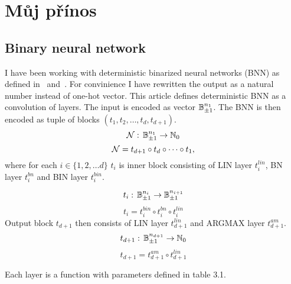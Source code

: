 \documentclass{fithesis}
\begin{document}

\chapter{Můj přínos}

\section{Binary neural network}

I have been working with deterministic binarized neural networks (BNN)
as defined in~\cite{Hubara2016BinarizedNN} and~\cite{10.1145/3563212}.
For convinience I have rewritten the output as a natural number instead of
one-hot vector.
This article defines deterministic BNN as a convolution of layers.
The input is
encoded as vector $\mathbb{B}_{\pm 1}^{n_1}$. The BNN is then encoded as tuple of blocks
$(t_1, t_2, \dots, t_d, t_{d+1})$.
\begin{equation*}
    \mathcal{N}: \, \mathbb{B}_{\pm 1}^{n_1} \to \mathbb{N}_0
\end{equation*}
\begin{equation}
    \mathcal{N} = t_{d+1} \circ t_d \circ \dots \circ t_1,
\end{equation}
where for each $i\in \{1, 2, \dots d\}$ $t_i$ is inner block consisting
of LIN layer $t_i^{lin}$, BN layer $t_i^{bn}$ and BIN layer $t_i^{bin}$.

\begin{equation*}
    t_i: \, \mathbb{B}_{\pm 1}^{n_i} \to \mathbb{B}_{\pm 1}^{n_{i+1}}
\end{equation*}
\begin{equation}
    t_i = t_i^{bin} \circ t_i^{bn} \circ t_i^{lin}
\end{equation}
Output block $t_{d+1}$ then consists of LIN layer $t_{d+1}^{lin}$ and ARGMAX layer
$t_{d+1}^{am}$.
\begin{equation*}
    t_{d+1}: \, \mathbb{B}_{\pm 1}^{n_{d+1}} \to \mathbb{N}_0
\end{equation*}
\begin{equation}
    t_{d+1} = t_{d+1}^{am} \circ t_{d+1}^{lin}
\end{equation}

Each layer is a function with parameters defined in table 3.1.
\end{document}
